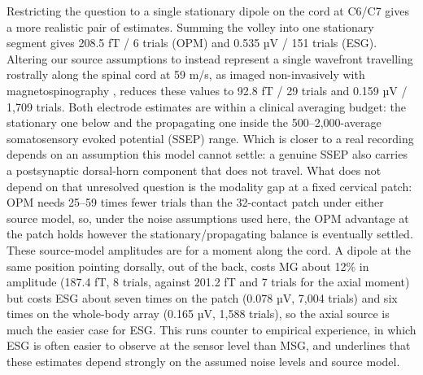 \documentclass[11pt]{article}
\newcommand{\revised}[1]{#1}
\begin{document}
Restricting the question to a single stationary dipole on the cord at \revised{C6/C7}
gives a more realistic pair of estimates. Summing the volley into one
stationary segment gives \revised{208.5 fT / 6 trials} (OPM) and \revised{0.535 µV / 151
trials} (ESG). Altering our source assumptions to instead represent a
single wavefront travelling rostrally along the spinal cord at 59 m/s,
as imaged non-invasively with magnetospinography
\citep{Miyano2020, Hashimoto2021},
reduces these values to \revised{92.8 fT / 29 trials and 0.159 µV / 1,709 trials}. \revised{Both electrode estimates are within a clinical averaging budget: the
stationary one below and the propagating one inside the
500--2,000-average somatosensory evoked potential (SSEP) range. Which is
closer to a real recording depends on an assumption this model cannot
settle: a genuine SSEP also carries a postsynaptic dorsal-horn component
that does not travel. What does not depend on that unresolved question
is the modality gap at a fixed cervical patch: OPM needs 25--59 times
fewer trials than the 32-contact patch under either source model, so,
under the noise assumptions used here, the OPM advantage at the patch
holds however the stationary/propagating balance is eventually
settled.} These source-model amplitudes are for a moment along the
cord. A dipole at the same position pointing dorsally, out of the back,
costs MG about 12\% in amplitude (187.4 fT, 8 trials, against 201.2 fT
and 7 trials for the axial moment) but costs ESG about seven times on
the patch (0.078 µV, 7,004 trials) and six times on the whole-body
array (0.165 µV, 1,588 trials), so the axial source is much the easier
case for ESG. This runs counter
to empirical experience, in which ESG is often easier to observe at the
sensor level than MSG, and underlines that these estimates depend
strongly on the assumed noise levels and source model.
\end{document}
